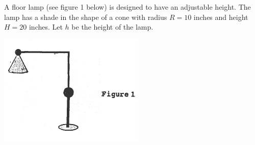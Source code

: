 \documentclass[nooutcomes]{ximera}
\begin{document}
\begin{problem}
A floor lamp (see figure 1 below) is designed to have an adjustable height.  The lamp has a shade in the shape of a cone with radius $R=10$ inches and height $H=20$ inches.  Let $h$ be the height of the lamp.  

		\begin{image}
		\includegraphics[scale=.5]{Figure14.png}
		\end{image}


\end{problem}
\end{document}
